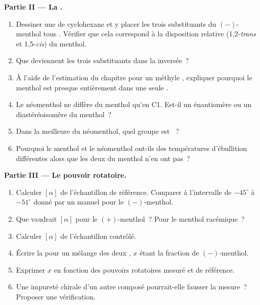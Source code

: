 \begin{problem}
\medskip
\noindent\textbf{Partie II --- La .}
\begin{enumerate}[resume]
  \item Dessiner une  de cyclohexane et y placer les trois
        substituants du $(-)$-menthol tous . Vérifier que cela
        correspond à la disposition relative (1,2-\textit{trans} et
        1,5-\textit{cis}) du menthol.
  \item Que deviennent les trois substituants dans la  inversée~?
  \item À l'aide de l'estimation du chapitre pour un méthyle ,
        expliquer pourquoi le menthol est presque entièrement dans une
        seule .
  \item Le néomenthol ne diffère du menthol qu'en C1. Est-il un
        énantiomère ou un diastéréoisomère du menthol~?
  \item Dans la meilleure  du néomenthol, quel groupe est ~?
  \item Pourquoi le menthol et le néomenthol ont-ils des températures
        d'ébullition différentes alors que les deux  du
        menthol n'en ont pas~?
\end{enumerate}

\medskip
\noindent\textbf{Partie III --- Le pouvoir rotatoire.}
\begin{enumerate}[resume]
  \item Calculer $[\alpha]$ de l'échantillon de référence. Comparer à
        l'intervalle de $-45^\circ$ à $-51^\circ$ donné par un manuel
        pour le $(-)$-menthol.
  \item Que vaudrait $[\alpha]$ pour le $(+)$-menthol~? Pour le menthol
        racémique~?
  \item Calculer $[\alpha]$ de l'échantillon contrôlé.
  \item Écrire la  pour un mélange des deux , $x$
        étant la fraction de $(-)$-menthol.
  \item Exprimer $x$ en fonction des pouvoirs rotatoires mesuré et de
        référence.
  \item Une impureté chirale d'un autre composé pourrait-elle fausser la
        mesure~? Proposer une vérification.
\end{enumerate}


\end{problem}
